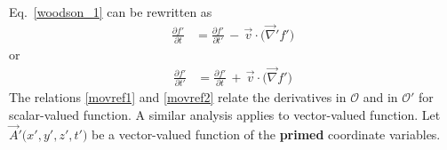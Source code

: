 \documentclass[11pt,a4paper,oneside]{book}
\numberwithin{equation}{section}
\theoremstyle{it}
\theoremstyle{definition}
\begin{document}
Eq.~\ref{woodson_1} can be rewritten as 
\begin{equation}\label{movref1}
	\begin{aligned}
		\frac{\partial f'}{\partial t} &= \frac{\partial f'}{\partial 
		t'}\,-\,\vec{v}\cdot\big(\vec{\nabla}'f'\big)
	\end{aligned}
\end{equation} 
or
\begin{equation}\label{movref2}
	\begin{aligned}
		\frac{\partial f'}{\partial t'} &= \frac{\partial f'}{\partial 
		t}\,+\,\vec{v}\cdot\big(\vec{\nabla}f'\big)
	\end{aligned}
\end{equation} 
The relations \ref{movref1} and \ref{movref2} relate the derivatives in 
$\mathcal{O}$ and in $\mathcal{O'}$ for scalar-valued function. A similar 
analysis applies to vector-valued function. Let $\vec{A}'\big(x',y',z',t'\big)$ 
be a vector-valued function of the \textbf{primed} coordinate variables. 
\end{document}
